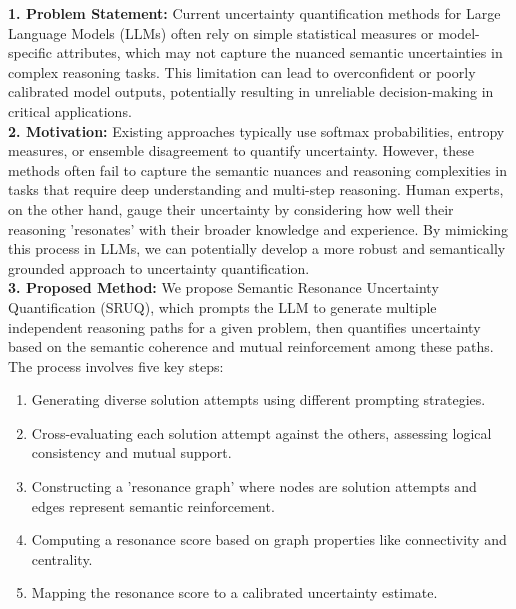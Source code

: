 \begin{tcolorbox}[colback=blue!5!white,colframe=blue!75!black,title=\textbf{Semantic Resonance Uncertainty Quantification (SRUQ) (Part 1)}]
  \small 
    \textbf{1. Problem Statement:} Current uncertainty quantification methods for Large Language Models (LLMs) often rely on simple statistical measures or model-specific attributes, which may not capture the nuanced semantic uncertainties in complex reasoning tasks. This limitation can lead to overconfident or poorly calibrated model outputs, potentially resulting in unreliable decision-making in critical applications.
\\

    \textbf{2. Motivation:} Existing approaches typically use softmax probabilities, entropy measures, or ensemble disagreement to quantify uncertainty. However, these methods often fail to capture the semantic nuances and reasoning complexities in tasks that require deep understanding and multi-step reasoning. Human experts, on the other hand, gauge their uncertainty by considering how well their reasoning 'resonates' with their broader knowledge and experience. By mimicking this process in LLMs, we can potentially develop a more robust and semantically grounded approach to uncertainty quantification.
\\

    \textbf{3. Proposed Method:} We propose Semantic Resonance Uncertainty Quantification (SRUQ), which prompts the LLM to generate multiple independent reasoning paths for a given problem, then quantifies uncertainty based on the semantic coherence and mutual reinforcement among these paths. The process involves five key steps:
    \begin{enumerate}
        \item Generating diverse solution attempts using different prompting strategies.
        \item Cross-evaluating each solution attempt against the others, assessing logical consistency and mutual support.
        \item Constructing a 'resonance graph' where nodes are solution attempts and edges represent semantic reinforcement.
        \item Computing a resonance score based on graph properties like connectivity and centrality.
        \item Mapping the resonance score to a calibrated uncertainty estimate.
    \end{enumerate}

\end{tcolorbox}

